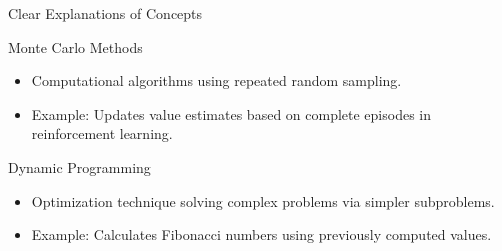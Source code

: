 \documentclass[aspectratio=169]{beamer}
\begin{document}
\begin{frame}{Clear Explanations of Concepts}
    \begin{block}{Monte Carlo Methods}
        \begin{itemize}
            \item Computational algorithms using repeated random sampling.
            \item Example: Updates value estimates based on complete episodes in reinforcement learning.
        \end{itemize}
    \end{block}

    \begin{block}{Dynamic Programming}
        \begin{itemize}
            \item Optimization technique solving complex problems via simpler subproblems.
            \item Example: Calculates Fibonacci numbers using previously computed values.
        \end{itemize}
    \end{block}
\end{frame}
\end{document}

